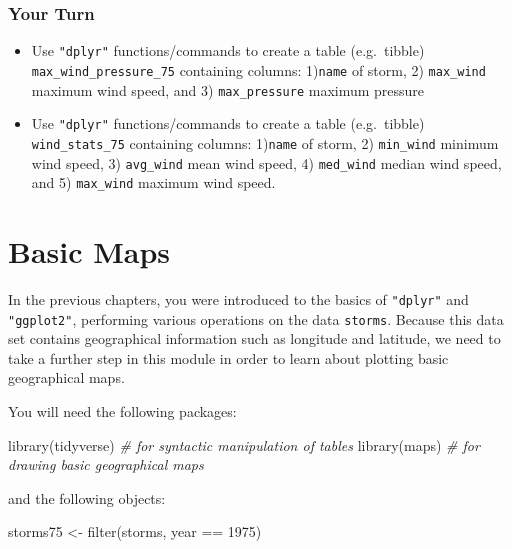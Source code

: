 \documentclass[
]{book}
\newenvironment{Shaded}{\begin{snugshade}}{\end{snugshade}}
\newcommand{\CommentTok}[1]{\textcolor[rgb]{0.56,0.35,0.01}{\textit{#1}}}
\newcommand{\DecValTok}[1]{\textcolor[rgb]{0.00,0.00,0.81}{#1}}
\newcommand{\FunctionTok}[1]{\textcolor[rgb]{0.00,0.00,0.00}{#1}}
\newcommand{\NormalTok}[1]{#1}
\newcommand{\OtherTok}[1]{\textcolor[rgb]{0.56,0.35,0.01}{#1}}
\newcommand{\SpecialCharTok}[1]{\textcolor[rgb]{0.00,0.00,0.00}{#1}}
\begin{document}
\hypertarget{your-turn-2}{%
\subsection{Your Turn}\label{your-turn-2}}

\begin{itemize}
\item
  Use \texttt{"dplyr"} functions/commands to create a table (e.g.~tibble)
  \texttt{max\_wind\_pressure\_75} containing columns: 1)\texttt{name} of
  storm, 2) \texttt{max\_wind} maximum wind speed, and 3) \texttt{max\_pressure} maximum pressure
\item
  Use \texttt{"dplyr"} functions/commands to create a table (e.g.~tibble)
  \texttt{wind\_stats\_75} containing columns: 1)\texttt{name} of storm, 2) \texttt{min\_wind} minimum
  wind speed, 3) \texttt{avg\_wind} mean wind speed, 4) \texttt{med\_wind} median wind speed,
  and 5) \texttt{max\_wind} maximum wind speed.
\end{itemize}

\hypertarget{basic-maps}{%
\chapter{Basic Maps}\label{basic-maps}}

In the previous chapters, you were introduced to the basics of \texttt{"dplyr"} and
\texttt{"ggplot2"}, performing various operations on the data \texttt{storms}. Because this
data set contains geographical information such as longitude and latitude, we
need to take a further step in this module in order to learn about plotting
basic geographical maps.

You will need the following packages:

\begin{Shaded}
\begin{Highlighting}[]
\FunctionTok{library}\NormalTok{(tidyverse)      }\CommentTok{\# for syntactic manipulation of tables}
\FunctionTok{library}\NormalTok{(maps)           }\CommentTok{\# for drawing basic geographical maps}
\end{Highlighting}
\end{Shaded}

and the following objects:

\begin{Shaded}
\begin{Highlighting}[]
\NormalTok{storms75 }\OtherTok{\textless{}{-}} \FunctionTok{filter}\NormalTok{(storms, year }\SpecialCharTok{==} \DecValTok{1975}\NormalTok{)}
\end{Highlighting}
\end{Shaded}
\end{document}
